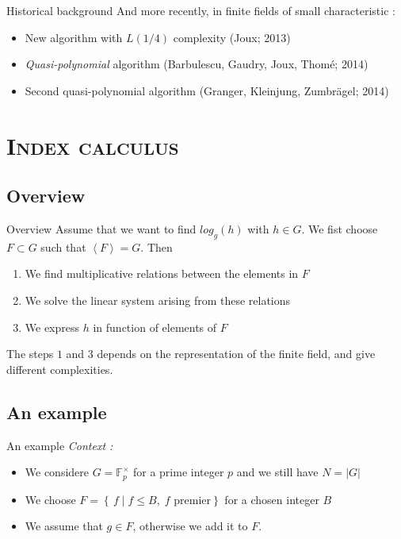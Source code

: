 \documentclass[xcolor=x11names,compress]{beamer}
\theoremstyle{break}
\theoremstyle{sc}
\theoremstyle{definition}
\theoremstyle{remark}
\begin{document}
\begin{frame}{Historical background}
  And more recently, in finite fields of small characteristic :
  \begin{itemize}
    \item New algorithm with $L(1/4)$ complexity (Joux; 2013)
    \item \emph{Quasi-polynomial} algorithm (Barbulescu, Gaudry, Joux, Thomé; 2014)
    \item Second quasi-polynomial algorithm (Granger, Kleinjung, Zumbrägel; 2014)
  \end{itemize}
\end{frame}

\section{\scshape Index calculus}
\subsection{Overview}
\begin{frame}{Overview}
  Assume that we want to find $log_g(h)$ with $h\in G$. We fist choose $F\subset
  G$ such that $\left\langle F \right\rangle = G$. Then
  \begin{enumerate}
    \item We find multiplicative relations between the elements in $F$
    \item We solve the linear system arising from these relations
    \item We express $h$ in function of elements of $F$
  \end{enumerate}
  The steps $1$ and $3$ depends on the representation of the finite field, and
  give different complexities.
\end{frame}

\subsection{An example}
\begin{frame}{An example}
  \emph{Context :}
  \begin{itemize}
    \item We considere $G = \mathbb{F}_p^\times$ for a prime integer $p$ and we
      still have $N = |G|$
    \item We choose $F = \left\{\, f \;|\; f \leq B,\; f \text{ premier}
    \right\}$ for a chosen integer $B$
  \item We assume that $g\in F$, otherwise we add it to $F$.
  \end{itemize}
\end{frame}
\end{document}
